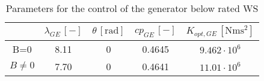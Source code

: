 \documentclass[11pt, a4paper]{article}
\newcommand{\mesunt}[1]{\left[\si{#1}\right]}
\begin{document}
\begin{table}[htb]
  \centering
  \caption{Parameters for the control of the generator below rated WS}
  \begin{tabular}{ccccc}
    \toprule
    & $\lambda_{GE} \, \left[-\right]$ & $\theta \, \mesunt{\radian}$ & $cp_{GE} \, \left[-\right]$ & $K_{opt,GE} \, \mesunt{\newton\meter\square\second}$ \\ \midrule
    B=0 & 8.11 & 0 & 0.4645 & $9.462 \cdot 10^6$\\
    $B\ne0$ & 7.70 & 0 & 0.4641 & $11.01 \cdot 10^6$\\ \bottomrule
  \end{tabular}
\end{table}
\end{document}
